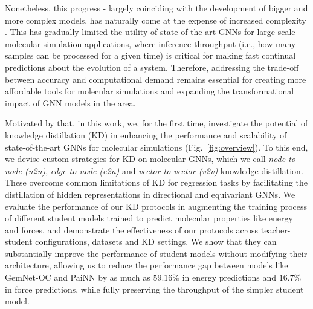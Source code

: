 \documentclass{article}
\begin{document}
Nonetheless, this progress - largely coinciding with the development of bigger and more complex models, has naturally come at the expense of increased complexity \cite{sriram2022towards, zitnick2022spherical}. This has gradually limited the utility of state-of-the-art GNNs for large-scale molecular simulation applications, where inference throughput (i.e., how many samples can be processed for a given time) is critical for making fast continual predictions about the evolution of a system. Therefore, addressing the trade-off between accuracy and computational demand remains essential for creating more affordable tools for molecular simulations and expanding the transformational impact of GNN models in the area.


Motivated by that, in this work, we, for the first time, investigate the potential of knowledge distillation (KD) in enhancing the performance and scalability of state-of-the-art GNNs for molecular simulations (Fig.~\ref{fig:overview}). 
To this end, we devise custom strategies for KD on molecular GNNs, which we call \emph{node-to-node (n2n)}, \emph{edge-to-node (e2n)} and \emph{vector-to-vector (v2v)} knowledge distillation. These overcome common limitations of KD for regression tasks by facilitating the distillation of hidden representations in directional and equivariant GNNs. We evaluate the performance of our KD protocols in augmenting the training process of different student models trained to predict molecular properties like energy and forces, and demonstrate the effectiveness of our protocols across teacher-student configurations, datasets and KD settings. We show that they can substantially improve the performance of student models without modifying their architecture, allowing us to reduce the performance gap between models like GemNet-OC \cite{gasteiger_gemnet_oc_2022} and PaiNN \cite{schutt_equivariant_2021} by as much as $59.16\%$ in energy predictions and $16.7\%$ in force predictions, while fully preserving the throughput of the simpler student model.
\end{document}
